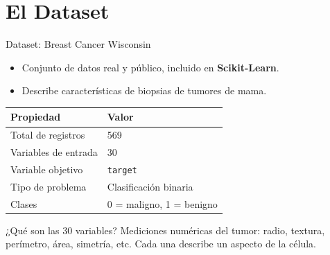 \documentclass[10pt,aspectratio=169]{beamer}
\begin{document}
\section{El Dataset}

\begin{frame}{Dataset: Breast Cancer Wisconsin}
  \begin{itemize}
    \item Conjunto de datos real y público, incluido en \textbf{Scikit-Learn}.
    \item Describe características de biopsias de tumores de mama.
  \end{itemize}

  \begin{center}
    \begin{tabular}{ll}
      \toprule
      \textbf{Propiedad} & \textbf{Valor} \\
      \midrule
      Total de registros & 569 \\
      Variables de entrada & 30 \\
      Variable objetivo & \texttt{target} \\
      Tipo de problema & Clasificación binaria \\
      Clases & 0 = maligno, 1 = benigno \\
      \bottomrule
    \end{tabular}
  \end{center}

  \pause
  \begin{block}{¿Qué son las 30 variables?}
    Mediciones numéricas del tumor: radio, textura, perímetro, área,
    simetría, etc. Cada una describe un aspecto de la célula.
  \end{block}
\end{frame}
\end{document}
